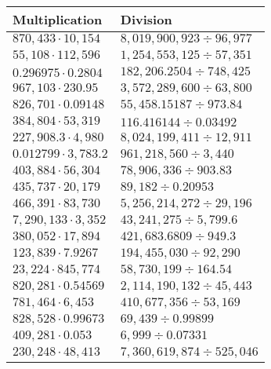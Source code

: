 \begin{longtable}[]{@{}ll@{}}
\toprule
Multiplication & Division\tabularnewline
\midrule
\endhead
\(870,433\cdot10,154\) & \(8,019,900,923÷96,977\)\tabularnewline
\(55,108\cdot112,596\) & \(1,254,553,125÷57,351\)\tabularnewline
\(0.296975\cdot0.2804\) & \(182,206.2504÷748,425\)\tabularnewline
\(967,103\cdot230.95\) & \(3,572,289,600÷63,800\)\tabularnewline
\(826,701\cdot0.09148\) & \(55,458.15187÷973.84\)\tabularnewline
\(384,804\cdot53,319\) & \(116.416144÷0.03492\)\tabularnewline
\(227,908.3\cdot4,980\) & \(8,024,199,411÷12,911\)\tabularnewline
\(0.012799\cdot3,783.2\) & \(961,218,560÷3,440\)\tabularnewline
\(403,884\cdot56,304\) & \(78,906,336÷903.83\)\tabularnewline
\(435,737\cdot20,179\) & \(89,182÷0.20953\)\tabularnewline
\(466,391\cdot83,730\) & \(5,256,214,272÷29,196\)\tabularnewline
\(7,290,133\cdot3,352\) & \(43,241,275÷5,799.6\)\tabularnewline
\(380,052\cdot17,894\) & \(421,683.6809÷949.3\)\tabularnewline
\(123,839\cdot7.9267\) & \(194,455,030÷92,290\)\tabularnewline
\(23,224\cdot845,774\) & \(58,730,199÷164.54\)\tabularnewline
\(820,281\cdot0.54569\) & \(2,114,190,132÷45,443\)\tabularnewline
\(781,464\cdot6,453\) & \(410,677,356÷53,169\)\tabularnewline
\(828,528\cdot0.99673\) & \(69,439÷0.99899\)\tabularnewline
\(409,281\cdot0.053\) & \(6,999÷0.07331\)\tabularnewline
\(230,248\cdot48,413\) & \(7,360,619,874÷525,046\)\tabularnewline
\bottomrule
\end{longtable}
